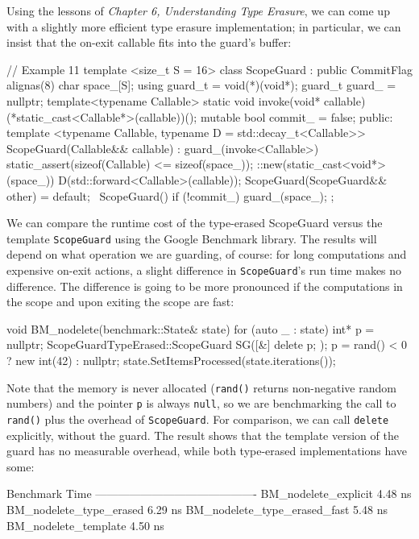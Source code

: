 Using the lessons of \emph{Chapter 6, Understanding Type Erasure}, we can come up with a slightly more efficient type erasure implementation; in particular, we can insist that the on-exit callable fits into the guard's buffer:

\begin{code}
// Example 11
template <size_t S = 16>
class ScopeGuard : public CommitFlag {
  alignas(8) char space_[S];
  using guard_t = void(*)(void*);
  guard_t guard_ = nullptr;
  template<typename Callable>
  static void invoke(void* callable) {
    (*static_cast<Callable*>(callable))();
  }
  mutable bool commit_ = false;
  public:
  template <typename Callable,
            typename D = std::decay_t<Callable>>
    ScopeGuard(Callable&& callable) :
    guard_(invoke<Callable>) {
    static_assert(sizeof(Callable) <= sizeof(space_));
    ::new(static_cast<void*>(space_))
      D(std::forward<Callable>(callable));
  }
  ScopeGuard(ScopeGuard&& other) = default;
  ~ScopeGuard() { if (!commit_) guard_(space_); }
};
\end{code}

We can compare the runtime cost of the type-erased ScopeGuard versus the template \texttt{ScopeGuard} using the Google Benchmark library. The results will depend on what operation we are guarding, of course: for long computations and expensive on-exit actions, a slight difference in \texttt{ScopeGuard}'s run time makes no difference. The difference is going to be more pronounced if the computations in the scope and upon exiting the scope are fast:

\begin{code}
void BM_nodelete(benchmark::State& state) {
  for (auto _ : state) {
    int* p = nullptr;
    ScopeGuardTypeErased::ScopeGuard SG([&] { delete p; });
    p = rand() < 0 ? new int(42) : nullptr;
  }
  state.SetItemsProcessed(state.iterations());
}
\end{code}

Note that the memory is never allocated (\texttt{rand()} returns non-negative random numbers) and the pointer \texttt{p} is always \texttt{null}, so we are benchmarking the call to \texttt{rand()} plus the overhead of \texttt{ScopeGuard}. For comparison, we can call \texttt{delete} explicitly, without the guard. The result shows that the template version of the guard has no measurable overhead, while both type-erased implementations have some:

\begin{code}
Benchmark                              Time
-------------------------------------------
BM_nodelete_explicit                4.48 ns
BM_nodelete_type_erased             6.29 ns
BM_nodelete_type_erased_fast        5.48 ns
BM_nodelete_template                4.50 ns
\end{code}

